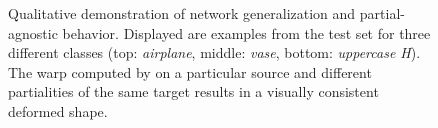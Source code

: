 \documentclass[acmtog,timestamp]{acmart}%
\begin{document}
\begin{figure}
\begin{tabular}{ c c c c c}
\end{tabular}
\caption{Qualitative demonstration of network generalization and partial-agnostic behavior. Displayed are examples from the test set for three different classes (top: \emph{airplane}, middle: \emph{vase}, bottom: \emph{uppercase H}). The warp computed by \ourmethod{} on a particular source and different partialities of the same target results in a visually consistent deformed shape. }
\label{fig:sweeping_partialT}
\end{figure}\begin{comment}
 &
\texttt{[image: figures/sweeping\_partial/airplane/sample011\_target.png]} &
\texttt{[image: figures/sweeping\_partial/airplane/sample001\_target.png]} &
\texttt{[image: figures/sweeping\_partial/airplane/sample002\_target.png]} &
\texttt{[image: figures/sweeping\_partial/airplane/sample003\_target.png]} &
\texttt{[image: figures/sweeping\_partial/airplane/sample004\_target.png]} &
\texttt{[image: figures/sweeping\_partial/airplane/sample005\_target.png]} &
\texttt{[image: figures/sweeping\_partial/airplane/sample006\_target.png]} &
\texttt{[image: figures/sweeping\_partial/airplane/sample007\_target.png]} &
\texttt{[image: figures/sweeping\_partial/airplane/sample008\_target.png]} &
\texttt{[image: figures/sweeping\_partial/airplane/sample010\_target.png]} \\

\texttt{[image: figures/sweeping\_partial/airplane/sample001\_source.png]} &
\texttt{[image: figures/sweeping\_partial/airplane/sample011\_targetPred.png]} &
\texttt{[image: figures/sweeping\_partial/airplane/sample001\_targetPred.png]} &
\texttt{[image: figures/sweeping\_partial/airplane/sample002\_targetPred.png]} &
\texttt{[image: figures/sweeping\_partial/airplane/sample003\_targetPred.png]} &
\texttt{[image: figures/sweeping\_partial/airplane/sample004\_targetPred.png]} &
\texttt{[image: figures/sweeping\_partial/airplane/sample005\_targetPred.png]} &
\texttt{[image: figures/sweeping\_partial/airplane/sample006\_targetPred.png]} &
\texttt{[image: figures/sweeping\_partial/airplane/sample007\_targetPred.png]} &
\texttt{[image: figures/sweeping\_partial/airplane/sample008\_targetPred.png]} &
\texttt{[image: figures/sweeping\_partial/airplane/sample010\_targetPred.png]} \\



\end{comment}
\end{document}

